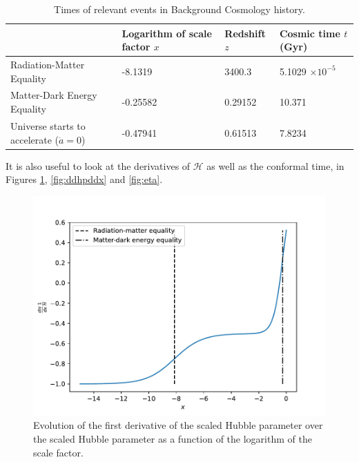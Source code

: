 \documentclass{aa}
\begin{document}
\begin{table}[ht]
\caption{Times of relevant events in Background Cosmology history.}             
\label{table:times}      
\centering          
\begin{tabular}{l l l l}     %
\hline\hline       
& Logarithm of scale factor $x$      & Redshift $z$     & Cosmic time $t$ (Gyr)\\ 
\hline                    
Radiation-Matter Equality   & -8.1319  & 3400.3  & 5.1029 $\times 10^{-5}$ \\
Matter-Dark Energy Equality & -0.25582 & 0.29152 & 10.371                 \\
Universe starts to accelerate ($\ddot a = 0$)               & -0.47941 & 0.61513 & 7.8234\\ 
\hline                  
\end{tabular}
\end{table}

It is also useful to look at the derivatives of $\mathcal H$ as well as the conformal time, in Figures \ref{fig:dhpdx}, \ref{fig:ddhpddx} and \ref{fig:eta}.
\begin{figure}[ht]
\centering
\includegraphics[width=\hsize]{figures/dHpdx_over_Hp.pdf}
  \caption{Evolution of the first derivative of the scaled Hubble parameter over the scaled Hubble parameter as a function of the logarithm of the scale factor.}
     \label{fig:dhpdx}
\end{figure}
\end{document}
